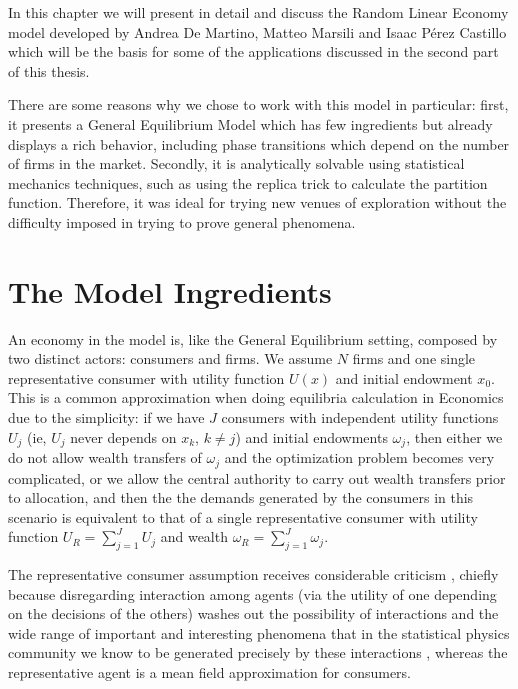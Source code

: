 In this chapter we will present in detail and discuss the Random
Linear Economy model \cite{DeMartinoMarsili04} developed by Andrea De
Martino, Matteo Marsili and Isaac Pérez Castillo which will be the
basis for some of the applications discussed in the second part of
this thesis.

There are some reasons why we chose to work with this model in
particular: first, it presents a General Equilibrium Model which has
few ingredients but already displays a rich behavior, including phase
transitions which depend on the number of firms in the
market. Secondly, it is analytically solvable using statistical
mechanics techniques, such as using the replica trick to calculate the
partition function. Therefore, it was ideal for trying new venues of
exploration without the difficulty imposed in trying to prove general
phenomena. 

\section{The Model Ingredients}

An economy in the model is, like the General Equilibrium setting,
composed by two distinct actors: consumers and firms. We assume $N$
firms and one single representative consumer with utility function
$U(x)$ and initial endowment $x_0$. This is a common approximation
when doing equilibria calculation in Economics due to the simplicity:
if we have $J$ consumers with independent utility functions $U_j$ (ie,
$U_j$ never depends on $x_k$, $k\neq j$) and initial endowments
$\omega_j$, then either we do not allow wealth transfers of $\omega_j$
and the optimization problem becomes very complicated, or we allow the
central authority to carry out wealth transfers prior to allocation,
and then the the demands generated by the consumers in this scenario
is equivalent to that of a single representative consumer with utility
function $U_R = \sum_{j=1}^J U_j$ and wealth
$\omega_R = \sum_{j=1}^J \omega_j$.

The representative consumer assumption receives considerable criticism
\cite{Kirman92}, chiefly because disregarding interaction among agents
(via the utility of one depending on the decisions of the others)
washes out the possibility of interactions and the wide range of
important and interesting phenomena that in the statistical physics
community we know to be generated precisely by these interactions
\cite{Bouchaud13}, whereas the representative agent is a mean field
approximation for consumers.

